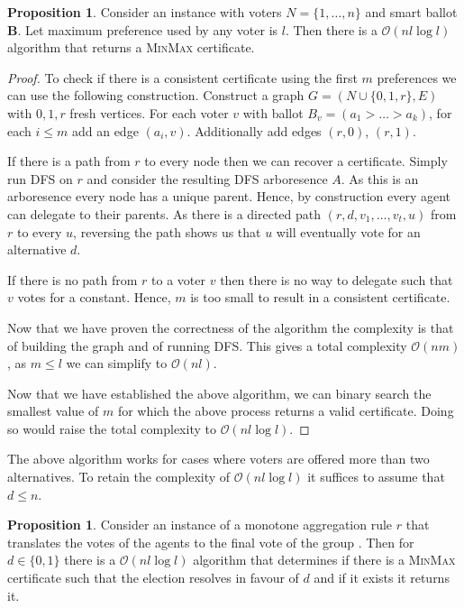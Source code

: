\documentclass[11pt,a4paper, titlepage]{article}
\theoremstyle{definition}
\newtheorem{proposition}[theorem]{Proposition}
\let\vec\mathbf
\begin{document}
\begin{proposition}
    Consider an instance with voters $N = \{1, \ldots, n\}$ and smart ballot $\vec{B}$. 
    Let maximum preference used by any voter is $l$.
    Then there is a $\mathcal{O}(nl \log l)$ algorithm that returns a \textsc{MinMax} certificate.
\end{proposition}

\begin{proof}
    To check if there is a consistent certificate using the first $m$ preferences we can use the following construction.
    Construct a graph $G = (N \cup \{0, 1, r\}, E)$ with $0, 1, r$ fresh vertices.
    For each voter $v$ with ballot $B_v = (a_1 > \ldots > a_k)$, for each $i \leq m$ add an edge $(a_i, v)$.
    Additionally add edges $(r, 0)$, $(r, 1)$.
    
    If there is a path from $r$ to every node then we can recover a certificate.
    Simply run DFS on $r$ and consider the resulting DFS arboresence $A$.
    As this is an arboresence every node has a unique parent. Hence, by construction every agent can delegate to their parents.
    As there is a directed path $(r, d, v_1, \ldots, v_t, u)$ from $r$ to every $u$, reversing the path shows us that $u$ will eventually vote for an alternative $d$.

    If there is no path from $r$ to a voter $v$ then there is no way to delegate such that $v$ votes for a constant. Hence, $m$ is too small to result in a consistent certificate.

    Now that we have proven the correctness of the algorithm the complexity is that of building the graph and of running DFS. This gives a total complexity $\mathcal{O}(nm)$, as $m \leq l$ we can simplify to $\mathcal{O}(nl)$.

    Now that we have established the above algorithm, we can binary search the smallest value of $m$  for which the above process returns a valid certificate. Doing so would raise the total complexity to $\mathcal{O}(nl \log l)$.
\end{proof}

The above algorithm works for cases where voters are offered more than two alternatives.
To retain the complexity of $\mathcal{O}(nl \log l)$ it suffices to assume that $d \leq n$.


\begin{proposition}
    Consider an instance of a monotone aggregation rule $r$ that translates the votes of the agents to the final vote of the group . 
    Then for $d \in \{0, 1\}$ there is a $\mathcal{O}(nl \log l)$ algorithm that determines if there is a \textsc{MinMax} certificate such that the election resolves in favour of $d$ and if it exists it returns it.
\end{proposition}
\end{document}
